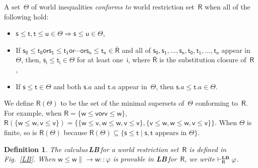 \documentclass[doctor]{iscs-thesis}
\newcommand{\vdashR}{\vdash_{\mathsf R}}
\newcommand{\vdashRLB}{\vdashR^{\mbox{\tiny \LB}}}
\newtheorem{definition}{Definition}
\newcommand{\LB}{\textbf{LB}}
\newcommand{\wor}{\mathsf{{or}}}
\begin{document}
A set~$\Theta$ of world inequalities
\textit{conforms to} world restriction set~$\mathsf R$ when all of the
following hold:
\begin{itemize}
 \item $\mathsf s\le \mathsf t, \mathsf t\le \mathsf u\in
       \Theta\Longrightarrow
       \mathsf s\le \mathsf u\in\Theta$,
 \item If $\mathsf{s_0}\le \mathsf{t_0} \wor \mathsf{s_1}\le \mathsf
       {t_1}\wor
       \cdots\wor \mathsf{s_n}\le
       \mathsf{t_n}\in \bar{\mathsf R}$ and all of
       $\mathsf{s_0},\mathsf{s_1},\ldots,\mathsf{s_n},
       \mathsf{t_0},\mathsf{t_1},\ldots, \mathsf{t_n}$ appear in~$\Theta$, then,
       $\mathsf{s_i}\le \mathsf{t_i}\in\Theta$ for at least
       one~$\mathsf{i}$, where $\bar {\mathsf R}$ is the substitution
       closure of~$\mathsf R$,
 \item If $\mathsf s\le\mathsf t\in\Theta$ and both $\mathsf s.a$ and
       $\mathsf t.a$ appear in~$\Theta$, then $\mathsf s.a\le\mathsf
       t.a\in \Theta$.
\end{itemize}
We define $\mathsf R(\Theta)$ to be the set of the minimal
supersets of~$\Theta$ conforming to~$\mathsf R$.
For example, when $\mathsf R=\{\mathsf w\le \mathsf v\wor\mathsf v\le \mathsf
w\}$,
$\mathsf R(\{\mathsf w\le \mathsf w, \mathsf v\le \mathsf v\}) =
\{\{\mathsf w\le \mathsf v, \mathsf w\le \mathsf w, \mathsf v \le
\mathsf v\}, \{\mathsf v \le
\mathsf w, \mathsf w\le \mathsf w, \mathsf v\le \mathsf v\}\}$\enspace.
 When $\Theta$ is finite, so is $\mathsf R(\Theta)$ because $\mathsf
 R(\Theta)\subseteq \{\mathsf s\le\mathsf
 t\mid\mathsf s,\mathsf t\mbox{ appears in }\Theta\}$.

\begin{definition}
 The calculus\,\LB\,for a world restriction set~$\mathsf R$ is defined in Fig.~\ref{LB}.
 When $\mathsf w\le \mathsf w\parallel \rightarrow \mathsf
 w::\varphi$ is provable in \LB\,for~$\mathsf R$,
 we write $\vdashRLB\varphi$.
\end{definition}
\end{document}
